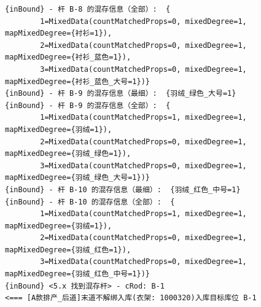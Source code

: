 {\begin{verbatim}
{inBound} - 杆 B-8 的混存信息（全部）:  {
		1=MixedData(countMatchedProps=0, mixedDegree=1, mapMixedDegree={衬衫=1}), 
		2=MixedData(countMatchedProps=0, mixedDegree=1, mapMixedDegree={衬衫_蓝色=1}), 
		3=MixedData(countMatchedProps=0, mixedDegree=1, mapMixedDegree={衬衫_蓝色_大号=1})}
{inBound} - 杆 B-9 的混存信息（最细）:  {羽绒_绿色_大号=1}
{inBound} - 杆 B-9 的混存信息（全部）:  {
		1=MixedData(countMatchedProps=1, mixedDegree=1, mapMixedDegree={羽绒=1}), 
		2=MixedData(countMatchedProps=0, mixedDegree=1, mapMixedDegree={羽绒_绿色=1}), 
		3=MixedData(countMatchedProps=0, mixedDegree=1, mapMixedDegree={羽绒_绿色_大号=1})}
{inBound} - 杆 B-10 的混存信息（最细）:  {羽绒_红色_中号=1}
{inBound} - 杆 B-10 的混存信息（全部）:  {
		1=MixedData(countMatchedProps=1, mixedDegree=1, mapMixedDegree={羽绒=1}), 
		2=MixedData(countMatchedProps=0, mixedDegree=1, mapMixedDegree={羽绒_红色=1}), 
		3=MixedData(countMatchedProps=0, mixedDegree=1, mapMixedDegree={羽绒_红色_中号=1})}
{inBound} <5.x 找到混存杆> - cRod: B-1
<=== [A款排产_后道]末道不解绑入库(衣架: 1000320)入库目标库位 B-1


\end{verbatim}}
